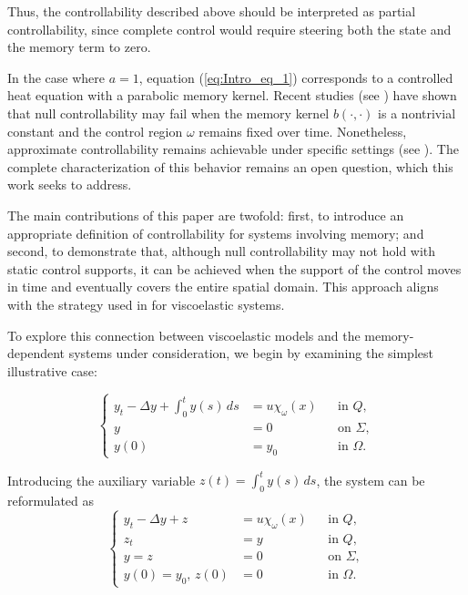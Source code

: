 \documentclass[12pt]{article}
\theoremstyle{plain}
\theoremstyle{definition}
\begin{document}
Thus, the controllability described above should be interpreted as partial controllability, since complete control would require steering both the state and the memory term to zero.

In the case where $a = 1$, equation (\ref{eq:Intro_eq_1}) corresponds to a controlled heat equation with a parabolic memory kernel. Recent studies (see \cite{guerrero2013remarks,halanay2012lack,pandolfi2013boundary,zhou2014interior}) have shown that null controllability may fail when the memory kernel $b(\cdot,\cdot)$ is a nontrivial constant and the control region $\omega$ remains fixed over time. Nonetheless, approximate controllability remains achievable under specific settings (see \cite{zhou2014interior,barbu2000controllability}). The complete characterization of this behavior remains an open question, which this work seeks to address.

The main contributions of this paper are twofold: first, to introduce an appropriate definition of controllability for systems involving memory; and second, to demonstrate that, although null controllability may not hold with static control supports, it can be achieved when the support of the control moves in time and eventually covers the entire spatial domain. This approach aligns with the strategy used in \cite{chaves2014null} for viscoelastic systems.

To explore this connection between viscoelastic models and the memory-dependent systems under consideration, we begin by examining the simplest illustrative case:

\begin{equation}\label{eq:Intro_eq_5}
\left\{
\begin{aligned}
    y_t - \Delta y + \int_0^t y(s)\,ds &= u\chi_\omega(x) && \text{in } Q, \\
    y &= 0 && \text{on } \Sigma, \\
    y(0) &= y_0 && \text{in } \Omega.
\end{aligned}
\right.
\end{equation}

Introducing the auxiliary variable $z(t) = \int_0^t y(s)\,ds$, the system can be reformulated as
\begin{equation}
\label{eq:Intro_eq_6}
\left\{
\begin{aligned}
    y_t - \Delta y + z &= u\chi_\omega(x) && \text{in } Q, \\
    z_t &= y && \text{in } Q, \\
    y = z &= 0 && \text{on } \Sigma, \\
    y(0) = y_0,\, z(0) &= 0 && \text{in } \Omega.
\end{aligned}
\right.
\end{equation}
\end{document}
